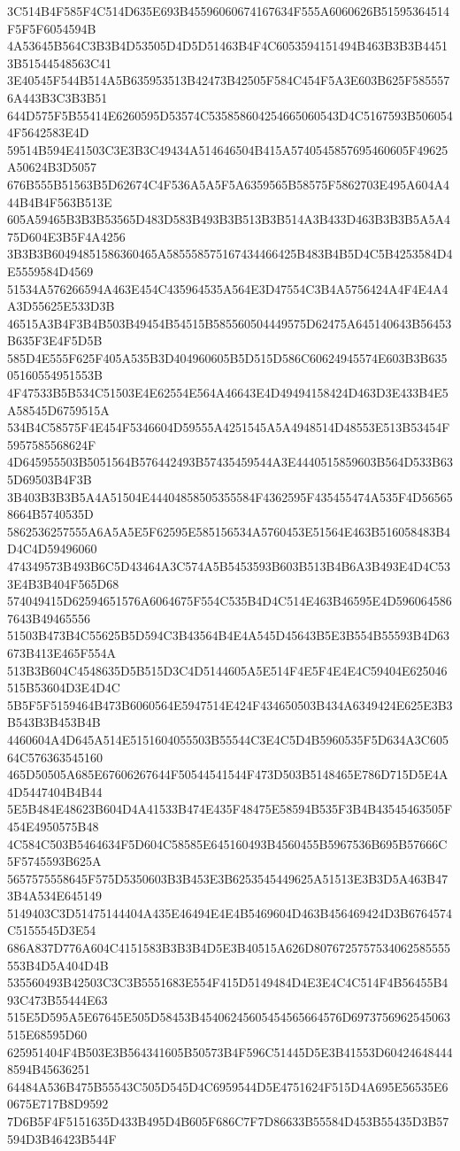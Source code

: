{{{{{{{{{{{{{{{{{{{{{3C514B4F585F4C514D635E693B45596060674167634F555A6060626B51595364514F5F5F6054594B
4A53645B564C3B3B4D53505D4D5D51463B4F4C6053594151494B463B3B3B44513B51544548563C41
3E40545F544B514A5B635953513B42473B42505F584C454F5A3E603B625F5855576A443B3C3B3B51
644D575F5B55414E6260595D53574C535858604254665060543D4C5167593B5060544F5642583E4D
59514B594E41503C3E3B3C49434A514646504B415A5740545857695460605F49625A50624B3D5057
676B555B51563B5D62674C4F536A5A5F5A6359565B58575F5862703E495A604A444B4B4F563B513E
605A59465B3B3B53565D483D583B493B3B513B3B514A3B433D463B3B3B5A5A475D604E3B5F4A4256
3B3B3B60494851586360465A585558575167434466425B483B4B5D4C5B4253584D4E5559584D4569
51534A576266594A463E454C435964535A564E3D47554C3B4A5756424A4F4E4A4A3D55625E533D3B
46515A3B4F3B4B503B49454B54515B585560504449575D62475A645140643B56453B635F3E4F5D5B
585D4E555F625F405A535B3D404960605B5D515D586C60624945574E603B3B63505160554951553B
4F47533B5B534C51503E4E62554E564A46643E4D49494158424D463D3E433B4E5A58545D6759515A
534B4C58575F4E454F5346604D59555A4251545A5A4948514D48553E513B53454F5957585568624F
4D645955503B5051564B576442493B57435459544A3E4440515859603B564D533B635D69503B4F3B
3B403B3B3B5A4A51504E44404858505355584F4362595F435455474A535F4D565658664B5740535D
5862536257555A6A5A5E5F62595E585156534A5760453E51564E463B516058483B4D4C4D59496060
474349573B493B6C5D43464A3C574A5B5453593B603B513B4B6A3B493E4D4C533E4B3B404F565D68
574049415D62594651576A6064675F554C535B4D4C514E463B46595E4D5960645867643B49465556
51503B473B4C55625B5D594C3B43564B4E4A545D45643B5E3B554B55593B4D63673B413E465F554A
513B3B604C4548635D5B515D3C4D5144605A5E514F4E5F4E4E4C59404E625046515B53604D3E4D4C
5B5F5F5159464B473B6060564E5947514E424F434650503B434A6349424E625E3B3B543B3B453B4B
4460604A4D645A514E5151604055503B55544C3E4C5D4B5960535F5D634A3C60564C576363545160
465D50505A685E67606267644F50544541544F473D503B5148465E786D715D5E4A4D5447404B4B44
5E5B484E48623B604D4A41533B474E435F48475E58594B535F3B4B43545463505F454E4950575B48
4C584C503B5464634F5D604C58585E645160493B4560455B5967536B695B57666C5F5745593B625A
5657575558645F575D5350603B3B453E3B6253545449625A51513E3B3D5A463B473B4A534E645149
5149403C3D51475144404A435E46494E4E4B5469604D463B456469424D3B6764574C5155545D3E54
686A837D776A604C4151583B3B3B4D5E3B40515A626D8076725757534062585555553B4D5A404D4B
535560493B42503C3C3B5551683E554F415D5149484D4E3E4C4C514F4B56455B493C473B55444E63
515E5D595A5E67645E505D58453B45406245605454565664576D6973756962545063515E68595D60
625951404F4B503E3B564341605B50573B4F596C51445D5E3B41553D604246484448594B45636251
64484A536B475B55543C505D545D4C6959544D5E4751624F515D4A695E56535E60675E717B8D9592
7D6B5F4F5151635D433B495D4B605F686C7F7D86633B55584D453B55435D3B57594D3B46423B544F
}}}}}}}}}}}}}}}}}}}}}
